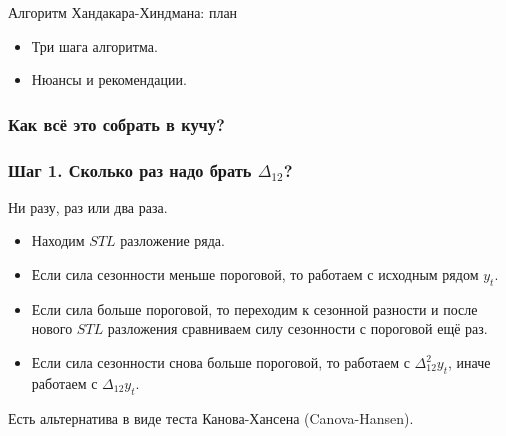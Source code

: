 
\begin{frame} %


\end{frame}

\begin{frame}{Алгоритм Хандакара-Хиндмана: план}
  \begin{itemize}[<+->]
    \item Три шага алгоритма. 
    \item Нюансы и рекомендации.
  \end{itemize}

\end{frame}


\begin{frame}
  \frametitle{Как всё это собрать в кучу?}




\end{frame}

\begin{frame}
  \frametitle{Шаг 1. Сколько раз надо брать $\Delta_{12}$?}

  Ни разу, раз или два раза.
  \pause
  \begin{itemize}[<+->]
    \item Находим $STL$ разложение ряда. 
  
    \item Если сила сезонности меньше пороговой, то работаем с исходным рядом $y_t$. 

    \item Если сила больше пороговой, то переходим к сезонной разности и 
    после нового $STL$ разложения сравниваем силу сезонности с пороговой ещё раз.

    \item Если сила сезонности снова больше пороговой, то работаем с $\Delta^2_{12} y_t$,
    иначе работаем с $\Delta_{12}y_t$.
  \end{itemize}
  \pause 
  Есть альтернатива в виде теста Канова-Хансена (Canova-Hansen).

\end{frame}

